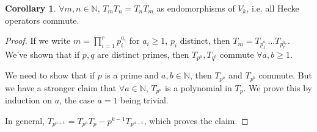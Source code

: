 \documentclass{article}
\theoremstyle{definition}
\newtheorem{cor}[theorem]{Corollary}
\begin{document}
\begin{cor}
    $\forall m,n \in \mathbb{N}$, $T_m T_n = T_n T_m$ as endomorphisms of $V_k$, i.e. all Hecke operators commute.
\end{cor}
\begin{proof}
    If we write $m = \prod_{i=1}^{r} p_i^{a_i}$ for $a_i\ge 1$, $p_i$ distinct, then $T_m = T_{p_1^{a_1}}\ldots T_{p_r^{a_r}}$. We've shown that if $p,q$ are distinct primes, then $T_{p^a}, T_{q^b}$ commute $\forall a,b\ge 1$.
    \vspace{1mm}
     
    We need to show that if $p$ is a prime and $a,b \in \mathbb{N}$, then $T_{p^a}$ and $T_{p^b}$ commute. But we have a stronger claim that $\forall a \in \mathbb{N}$, $T_{p^a}$ is a polynomial in $T_p$. We prove this by induction on $a$, the case $a=1$ being trivial.
    \vspace{1mm}
     
    In general, $T_{p^{a+1}} = T_{p^a} T_p - p^{k-1}T_{p^{a-1}}$, which proves the claim.
\end{proof}
 
\end{document}
